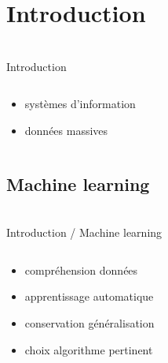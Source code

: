 \section{Introduction}
\begin{frame}{\bititle\\Introduction}
\begin{columns}\begin{column}{.5\textwidth}

\begin{itemize}
\item<1-> systèmes d’information
\item<2-> données massives
\end{itemize}

\end{column}\begin{column}{.5\textwidth}


\end{column}\end{columns}
\end{frame}
\subsection{Machine learning}
\begin{frame}{\bititle\\Introduction / Machine learning}
\begin{columns}\begin{column}{.5\textwidth}

\begin{itemize}
\item<1-> compréhension données
\item<2-> apprentissage automatique
\item<3-> conservation généralisation
\item<4-> choix algorithme pertinent
\end{itemize}

\end{column}\begin{column}{.5\textwidth}


\end{column}\end{columns}
\end{frame}
